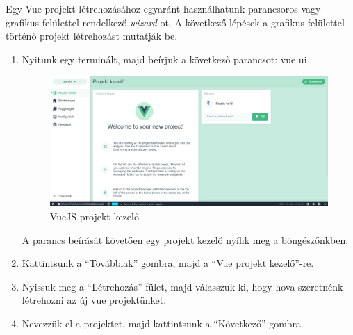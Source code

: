 Egy Vue projekt létrehozásához egyaránt használhatunk parancsoros vagy grafikus felülettel rendelkező \textit{wizard}-ot. A következő lépések a grafikus felülettel történő projekt létrehozást mutatják be.
\begin{enumerate}
  \item Nyitunk egy terminált, majd beírjuk a következő parancsot: vue ui
\begin{figure}[h!]
\centering
\includegraphics[width=\textwidth]{images/1617369552704.png}
\caption{VueJS projekt kezelő}
\label{fig:ff}
\end{figure}
A parancs beírását követően egy projekt kezelő nyílik meg a böngészőnkben.
\newpage
  \item Kattintsunk a “Továbbiak” gombra, majd a “Vue projekt kezelő”-re.
  \item Nyissuk meg a “Létrehozás” fület, majd válasszuk ki, hogy hova szeretnénk létrehozni az új vue projektünket.

  \item Nevezzük el a projektet, majd kattintsunk a “Következő” gombra.


\end{enumerate}

